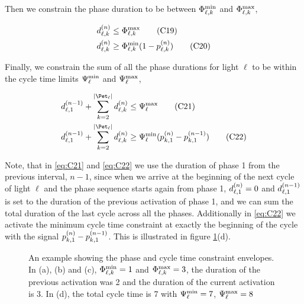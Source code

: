 Then we constrain the phase duration to be between $\PTMIN{\ell}{k}$ and $\PTMAX{\ell}{k}$,

\begin{align}
\pd{\ell}{k} &\le \PTMAX{\ell}{k}\tag{C19}\label{eq:C19}\\
\pd{\ell}{k} &\ge \PTMIN{\ell}{k}(1 - \p{\ell}{k})\tag{C20}\label{eq:C20}
\end{align}

Finally, we constrain the sum of all the phase durations for light $\ell$ to be
within the cycle time limits $\CTMIN{\ell}$ and $\CTMAX{\ell}$,

\begin{align}
\pd[n-1]{\ell}{1} + \sum\limits_{k=2}^{\Pn} \pd{\ell}{k} &\le \CTMAX{\ell} \tag{C21}\label{eq:C21}\\
\pd[n-1]{\ell}{1} + \sum\limits_{k=2}^{\Pn} \pd{\ell}{k} &\ge \CTMIN{\ell} (\p{k}{1} - \p[n-1]{k}{1})\tag{C22}\label{eq:C22}
\end{align}

Note, that in \ref{eq:C21} and \ref{eq:C22} we use the duration of phase 1 from
the previous interval, $n-1$,  since when we arrive at the beginning of the next
cycle of light $\ell$ and the phase sequence starts again from phase 1,
$\pd{\ell}{1}=0$ and $\pd[n-1]{\ell}{1}$ is set to the duration of the previous
activation of phase 1, and we can sum the total duration of the last cycle
across all the phases. Additionally in \ref{eq:C22} we activate the minimum
cycle time constraint at exactly the beginning of the cycle with the signal
$\p{k}{1} - \p[n-1]{k}{1}$. This is illustrated in figure
\ref{fig:phase_plots}(d).

\begin{figure*}[t!]
\centering
\caption{An example showing the phase and cycle time constraint envelopes. In
(a), (b) and (c), $\PTMIN{\ell}{k}=1$ and $\PTMAX{\ell}{k}=3$, the duration of
the previous activation was 2 and the duration of the current activation is 3.
In (d), the total cycle time is 7 with $\CTMIN{\ell}=7$, $\CTMAX{\ell}=8$}
\label{fig:phase_plots}
\end{figure*}

